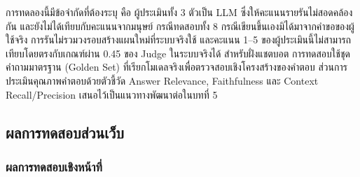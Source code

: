 การทดลองนี้มีข้อจำกัดที่ต้องระบุ คือ ผู้ประเมินทั้ง 3 ตัวเป็น LLM ซึ่งให้คะแนนรายรันไม่สอดคล้องกัน และยังไม่ได้เทียบกับคะแนนจากมนุษย์ กรณีทดสอบทั้ง 8 กรณีเขียนขึ้นเองมิได้มาจากคำขอของผู้ใช้จริง การรันไม่รวมวงรอบสร้างแผนใหม่ที่ระบบจริงใช้ และคะแนน 1--5 ของผู้ประเมินนี้ไม่สามารถเทียบโดยตรงกับเกณฑ์ผ่าน 0.45 ของ Judge ในระบบจริงได้ สำหรับฝั่งแชตบอต การทดสอบใช้ชุดคำถามมาตรฐาน (Golden Set) ที่เรียกโมเดลจริงเพื่อตรวจสอบเชิงโครงสร้างของคำตอบ ส่วนการประเมินคุณภาพคำตอบด้วยตัวชี้วัด Answer Relevance, Faithfulness และ Context Recall/Precision เสนอไว้เป็นแนวทางพัฒนาต่อในบทที่ 5

\subsection{ผลการทดสอบส่วนเว็บ}

\subsubsection{ผลการทดสอบเชิงหน้าที่}

